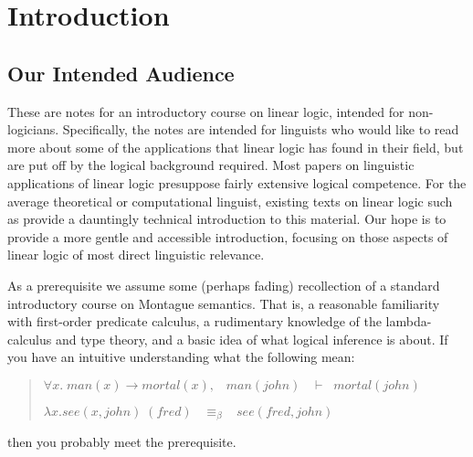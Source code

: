 \newcommand{\lf}[1]{#1}
\newcommand{\mycite}[1]{#1}
\newcommand{\makedash}[1]{#1}
\newcommand{\node}[2]{#1,#2}
\newcommand{\nodeconnect}[2]{#1,#2}
\newcommand{\nodetriangle}[2]{#1,#2}
\newcommand{\anodecurve}[6]{#1}
\newcommand{\linimp}[0]{\multimap}
\newcommand{\imp}[0]{\to}
\newcommand{\impE}[0]{\to_E}
\newcommand{\impI}[0]{\to_I}
\newcommand{\tensor}[0]{\otimes}
\newcommand{\lwith}[0]{lwith}
\newcommand{\lplus}[0]{lplus}
\newcommand{\lone}[0]{lone}
\newcommand{\lzero}[0]{lzero}
\newcommand{\resultsin}[0]{results}


\chapter{Introduction} \label{CH0}\label{Ch0}

\section{Our Intended Audience}

These are notes for an introductory course on linear logic, 
intended for non-logicians.  Specifically, the
notes are intended for linguists who would like to read more about
some of the applications that linear logic has found in their field,
but are put off by the logical background required.
Most papers on linguistic applications of linear logic presuppose
fairly extensive logical competence.
For the average theoretical or computational 
linguist, existing texts on linear logic such
as \cite{Troelstra} provide a dauntingly technical introduction to
this material. Our hope is to provide a more gentle and accessible
introduction, focusing on those aspects of linear logic of most direct
linguistic relevance.

As a prerequisite we assume some (perhaps fading) recollection of
a standard introductory course on Montague semantics.  
That is, a reasonable familiarity
with first-order predicate calculus, a rudimentary knowledge of the
lambda-calculus and type theory, and a basic idea of what logical
inference is about.  If you have an intuitive understanding what the
following mean: 
\begin{quote}
$\forall x.\; \lf{man}(x)\rightarrow \lf{mortal}(x), \;\;\;
\lf{man}(\lf{john}) \;\;\;\vdash \;\; \lf{mortal}(\lf{john})$

$\lambda x. \lf{see}(x,\lf{john})\;(\lf{fred}) \;\;\; \equiv_\beta \;\;\;
\lf{see}(\lf{fred},\lf{john})$
\end{quote}
then you probably meet the prerequisite.


